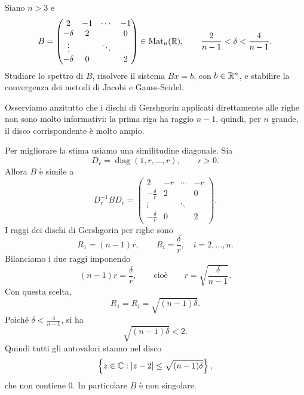 \documentclass[a4paper]{article}
\begin{document}
\begin{snippetexercise}{}
    Siano \(n>3\) e
    \[
        B =
        \begin{pmatrix}
            2 & -1 & \cdots & -1 \\
            -\delta & 2 & & 0 \\
            \vdots & & \ddots & \\
            -\delta & 0 & & 2
        \end{pmatrix}
        \in \operatorname{Mat}_n(\mathbb{R}),
        \qquad
        \frac{2}{n-1}<\delta<\frac{4}{n-1}.
    \]
    Studiare lo spettro di \(B\), risolvere il sistema \(Bx=b\), con
    \(b\in\mathbb{R}^n\), e stabilire la convergenza dei metodi di Jacobi e
    Gauss-Seidel.
\end{snippetexercise}

\begin{snippetsolution}{}
    Osserviamo anzitutto che i dischi di Gershgorin applicati direttamente alle
    righe non sono molto informativi: la prima riga ha raggio \(n-1\), quindi, per
    \(n\) grande, il disco corrispondente è molto ampio.

    Per migliorare la stima usiamo una similitudine diagonale. Sia
    \[
        D_r=\operatorname{diag}(1,r,\ldots,r),
        \qquad r>0.
    \]
    Allora \(B\) è simile a
    \[
        D_r^{-1}BD_r =
        \begin{pmatrix}
            2 & -r & \cdots & -r \\
            -\frac{\delta}{r} & 2 & & 0 \\
            \vdots & & \ddots & \\
            -\frac{\delta}{r} & 0 & & 2
        \end{pmatrix}.
    \]
    I raggi dei dischi di Gershgorin per righe sono
    \[
        R_1=(n-1)r,
        \qquad
        R_i=\frac{\delta}{r}, \quad i=2,\ldots,n.
    \]
    Bilanciamo i due raggi imponendo
    \[
        (n-1)r=\frac{\delta}{r},
        \qquad\text{cioè}\qquad
        r=\sqrt{\frac{\delta}{n-1}}.
    \]
    Con questa scelta,
    \[
        R_1=R_i=\sqrt{(n-1)\delta}.
    \]
    Poiché \(\delta<\frac{4}{n-1}\), si ha
    \[
        \sqrt{(n-1)\delta}<2.
    \]
    Quindi tutti gli autovalori stanno nel disco
    \[
        \left\{z\in\mathbb{C}:|z-2|\leq \sqrt{(n-1)\delta}\right\},
    \]
    che non contiene \(0\). In particolare \(B\) è non singolare.


\end{snippetsolution}
\end{document}
